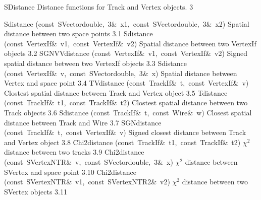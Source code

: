 \documentclass{article}
\begin{document}
\begin{cxxentry}
{}
        {SDistance}
        {}
        {Distance functions for Track and Vertex objects.
}
        {3}
\begin{cxxnames}
        {Sdistance}
        {(const\ SVector\<double,\ 3\>\&\ x1,\ const\ SVector\<double,\ 3\>\&\ x2)}
        {Spatial distance between two space points}
        {3.1}
        {Sdistance}
        {(const\ VertexIf\&\ v1,\ const\ VertexIf\&\ v2)}
        {Spatial distance between two VertexIf objects}
        {3.2}
        {SGNVVdistance}
        {(const\ VertexIf\&\ v1,\ const\ VertexIf\&\ v2)}
        {Signed spatial distance between two VertexIf objects}
        {3.3}
        {Sdistance}
        {(const\ VertexIf\&\ v,\ const\ SVector\<double,\ 3\>\&\ x)}
        {Spatial distance between Vertex and space point}
        {3.4}
        {TVdistance}
        {(const\ TrackIf\&\ t,\ const\ VertexIf\&\ v)}
        {Clostest spatial distance between Track and Vertex object}
        {3.5}
        {Tdistance}
        {(const\ TrackIf\&\ t1,\ const\ TrackIf\&\ t2)}
        {Clostest spatial distance between two Track objects}
        {3.6}
        {Sdistance}
        {(const\ TrackIf\&\ t,\ const\ Wire\&\ w)}
        {Closest spatial distance between Track and Wire}
        {3.7}
        {SGNdistance}
        {(const\ TrackIf\&\ t,\ const\ VertexIf\&\ v)}
        {Signed closest distance between Track and Vertex object}
        {3.8}
        {Chi2distance}
        {(const\ TrackIf\&\ t1,\ const\ TrackIf\&\ t2)}
        {$\chi^2$ distance between two tracks}
        {3.9}
        {Chi2distance}
        {(const\ SVertex\<NTR\>\&\ v,\ const\ SVector\<double,\ 3\>\&\ x)}
        {$\chi^2$ distance between SVertex and space point}
        {3.10}
        {Chi2distance}
        {(const\ SVertex\<NTR\>\&\ v1,\ const\ SVertex\<NTR2\>\&\ v2)}
        {$\chi^2$ distance between two SVertex objects}
        {3.11}
\end{cxxnames}
\begin{cxxdoc}


\end{cxxdoc}
\end{cxxentry}
\end{document}

